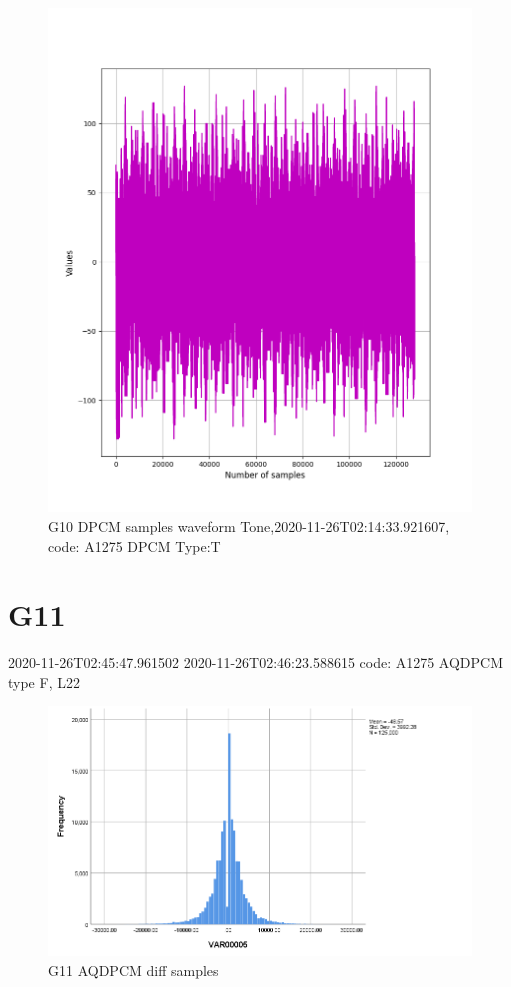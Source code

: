 \documentclass[hidelinks, 12pt, a4paper]{article}
\begin{document}
\begin{figure}[h!]
\centering
	\includegraphics[height=.38\textheight, width=\textwidth]{assets/session1/g10.png}
    \caption{G10 DPCM samples waveform Tone,2020-11-26T02:14:33.921607, code: A1275 DPCM Type:T}
\end{figure}

\section{G11}
2020-11-26T02:45:47.961502
2020-11-26T02:46:23.588615
code: A1275 AQDPCM type F, L22
\begin{figure}[h!]
\centering
	\includegraphics[height=.38\textheight, width=\textwidth]{assets/session1/g11.png}
    \caption{G11 AQDPCM diff samples}
\end{figure}
\end{document}
